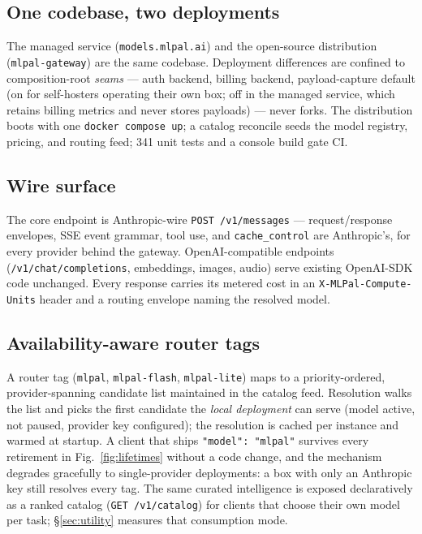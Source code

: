 \documentclass[10pt]{article}
\begin{document}
\subsection{One codebase, two deployments}
The managed service (\texttt{models.mlpal.ai}) and the open-source distribution (\texttt{mlpal-gateway}) are the same codebase. Deployment differences are confined to composition-root \emph{seams} --- auth backend, billing backend, payload-capture default (on for self-hosters operating their own box; off in the managed service, which retains billing metrics and never stores payloads) --- never forks. The distribution boots with one \texttt{docker compose up}; a catalog reconcile seeds the model registry, pricing, and routing feed; 341 unit tests and a console build gate CI.

\subsection{Wire surface}
The core endpoint is Anthropic-wire \texttt{POST /v1/messages} --- request/response envelopes, SSE event grammar, tool use, and \texttt{cache\_control} are Anthropic's, for every provider behind the gateway. OpenAI-compatible endpoints (\texttt{/v1/chat/completions}, embeddings, images, audio) serve existing OpenAI-SDK code unchanged. Every response carries its metered cost in an \texttt{X-MLPal-Compute-Units} header and a routing envelope naming the resolved model.

\subsection{Availability-aware router tags}
A router tag (\texttt{mlpal}, \texttt{mlpal-flash}, \texttt{mlpal-lite}) maps to a priority-ordered, provider-spanning candidate list maintained in the catalog feed. Resolution walks the list and picks the first candidate the \emph{local deployment} can serve (model active, not paused, provider key configured); the resolution is cached per instance and warmed at startup. A client that ships \texttt{"model": "mlpal"} survives every retirement in Fig.~\ref{fig:lifetimes} without a code change, and the mechanism degrades gracefully to single-provider deployments: a box with only an Anthropic key still resolves every tag. The same curated intelligence is exposed declaratively as a ranked catalog (\texttt{GET /v1/catalog}) for clients that choose their own model per task; \S\ref{sec:utility} measures that consumption mode.
\end{document}

